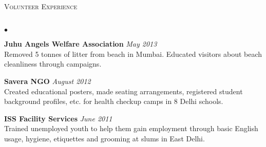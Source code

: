 \documentclass[10pt]{article}
\newcommand{\lineunder}{\vspace*{-8pt} \\ \hspace*{-18pt} \hrulefill \\}
\newcommand{\header}[1]{{\hspace*{-15pt}\vspace*{6pt} \textsc{#1}} \vspace*{-6pt} \lineunder}
\newenvironment{achievements}{\begin{list}{$\bullet$}{\topsep 0pt \itemsep -1.5pt \leftmargin 5pt}}{\vspace*{4pt}\end{list}}
\begin{document}
\header{\normalsize Volunteer Experience}
\begin{achievements}
\item \textbf{Juhu Angels Welfare Association}   \hfill \textit{May 2013}
\\ Removed 5 tonnes of litter from beach in Mumbai. Educated visitors about beach cleanliness through campaigns.
\item \textbf{Savera NGO}     \hfill \textit{August 2012}
\\ Created educational posters, made seating arrangements, registered student background profiles, etc. for health checkup camps in 8 Delhi schools.
\item \textbf{ISS Facility Services}    \hfill \textit{June 2011}
\\ Trained unemployed youth to help them gain employment through basic English usage, hygiene, etiquettes and grooming at slums in East Delhi.
\end{achievements}
\end{document}
